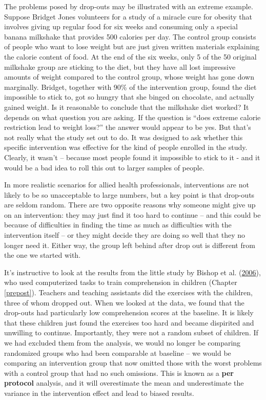 \documentclass{krantz}
\begin{document}
The problems posed by drop-outs may be illustrated with an extreme example. Suppose Bridget Jones volunteers for a study of a miracle cure for obesity that involves giving up regular food for six weeks and consuming only a special banana milkshake that provides 500 calories per day. The control group consists of people who want to lose weight but are just given written materials explaining the calorie content of food. At the end of the six weeks, only 5 of the 50 original milkshake group are sticking to the diet, but they have all lost impressive amounts of weight compared to the control group, whose weight has gone down marginally. Bridget, together with 90\% of the intervention group, found the diet impossible to stick to, got so hungry that she binged on chocolate, and actually gained weight. Is it reasonable to conclude that the milkshake diet worked? It depends on what question you are asking. If the question is ``does extreme calorie restriction lead to weight loss?'' the answer would appear to be yes. But that's not really what the study set out to do. It was designed to ask whether this specific intervention was effective for the kind of people enrolled in the study. Clearly, it wasn't -- because most people found it impossible to stick to it - and it would be a bad idea to roll this out to larger samples of people.

In more realistic scenarios for allied health professionals, interventions are not likely to be so unacceptable to large numbers, but a key point is that drop-outs are seldom random. There are two opposite reasons why someone might give up on an intervention: they may just find it too hard to continue -- and this could be because of difficulties in finding the time as much as difficulties with the intervention itself -- or they might decide they are doing so well that they no longer need it. Either way, the group left behind after drop out is different from the one we started with.

It's instructive to look at the results from the little study by Bishop et al. (\protect\hyperlink{ref-bishop2006}{2006}), who used computerized tasks to train comprehension in children (Chapter \ref{prepost}). Teachers and teaching assistants did the exercises with the children, three of whom dropped out. When we looked at the data, we found that the drop-outs had particularly low comprehension scores at the baseline. It is likely that these children just found the exercises too hard and became dispirited and unwilling to continue. Importantly, they were not a random subset of children. If we had excluded them from the analysis, we would no longer be comparing randomized groups who had been comparable at baseline -- we would be comparing an intervention group that now omitted those with the worst problems with a control group that had no such omissions. This is known as a \textbf{per protocol} analysis, and it will overestimate the mean and underestimate the variance in the intervention effect and lead to biased results.
\end{document}
